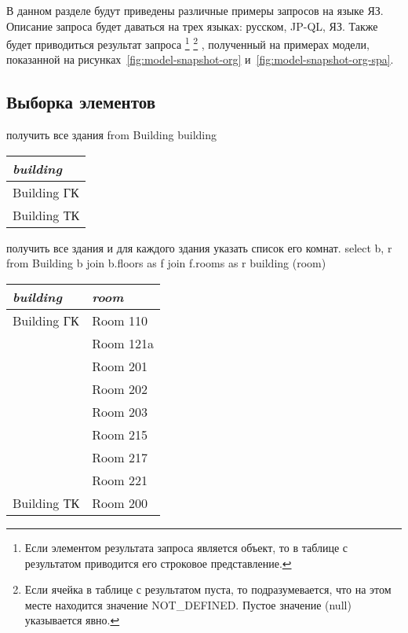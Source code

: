 
В данном разделе будут приведены различные примеры запросов на языке ЯЗ.
Описание запроса будет даваться на трех языках: русском, JP-QL, ЯЗ. Также
будет приводиться результат запроса
    \footnote{Если элементом результата запроса является объект, то в таблице с результатом
	приводится его строковое представление.}
    \footnote{Если ячейка в таблице с результатом пуста, то подразумевается, что
	на этом месте находится значение NOT\_DEFINED. Пустое значение (null) указывается явно.}
, полученный на примерах модели, показанной  на рисунках~\ref{fig:model-snapshot-org} и~\ref{fig:model-snapshot-org-spa}.

\subsection{Выборка элементов}
\exastable
    {получить все здания}
    {from Building}
    {building}
    {\begin{tabular}{|l|}
	\hline
	\it{building}\\[5pt]
	\hline
	\hline
	Building ГК\\
	\hline
	Building ТК\\
	\hline
    \end{tabular}}


\exastable
    {получить все здания и для каждого здания указать список его комнат.}
    {select b, r from Building b join b.floors as f join f.rooms as r}
    {building (room)}
    {\begin{tabular}{|l|l|}
	\hline
	\it{building} & \it{room} \\[5pt]
	\hline
	\hline
	Building ГК & Room 110\\
	\cline{2-2}
		    & Room 121a\\
	\cline{2-2}
		    & Room 201\\
	\cline{2-2}
		    & Room 202\\
	\cline{2-2}
		    & Room 203\\
	\cline{2-2}
		    & Room 215\\
	\cline{2-2}
		    & Room 217\\
	\cline{2-2}
		    & Room 221\\
	\hline
	Building ТК & Room 200\\	
	\hline
    \end{tabular}}

